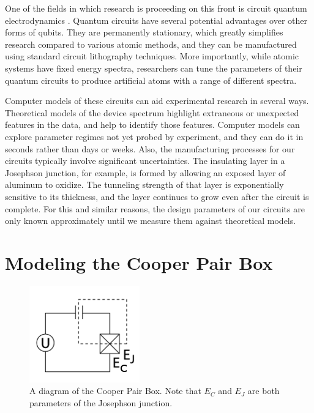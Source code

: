 \documentclass[twocolumn]{revtex4}
\begin{document}
One of the fields in which research is proceeding on this front is
circuit quantum electrodynamics \cite{Blais,Wallraff}. Quantum
circuits have several potential advantages over other forms of
qubits. They are permanently stationary, which greatly simplifies
research compared to various atomic methods, and they can be
manufactured using standard circuit lithography techniques. More
importantly, while atomic systems have fixed energy spectra,
researchers can tune the parameters of their quantum circuits to
produce artificial atoms with a range of different spectra.

Computer models of these circuits can aid experimental research in
several ways. Theoretical models of the device spectrum highlight
extraneous or unexpected features in the data, and help to identify
those features. Computer models can explore parameter regimes not yet
probed by experiment, and they can do it in seconds rather than days
or weeks. Also, the manufacturing processes for our circuits typically
involve significant uncertainties. The insulating layer in a Josephson
junction, for example, is formed by allowing an exposed layer of
aluminum to oxidize. The tunneling strength of that layer is
exponentially sensitive to its thickness, and the layer continues to
grow even after the circuit is complete. For this and similar reasons,
the design parameters of our circuits are only known approximately
until we measure them against theoretical models.

\section{Modeling the Cooper Pair Box}

\begin{figure}
  \includegraphics[width=.5\linewidth]{CPB-circuit.png}
  \caption{A diagram of the Cooper Pair Box. Note that $E_C$ and $E_J$
    are both parameters of the Josephson junction.}
  \label{cpb-circuit}
\end{figure}
\end{document}
